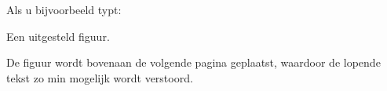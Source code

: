 
Als u bijvoorbeeld typt:

\startbuffer
\startuitstellen
\plaatsfiguur
  {Een uitgesteld figuur.}
  {\externfiguur[ma-cb-16][breedte=\tekstbreedte]}
\stopuitstellen
\stopbuffer

\typebuffer

De figuur wordt bovenaan de volgende pagina geplaatst,
waardoor de lopende tekst zo min mogelijk wordt verstoord.

\haalbuffer

\stoponderdeel
